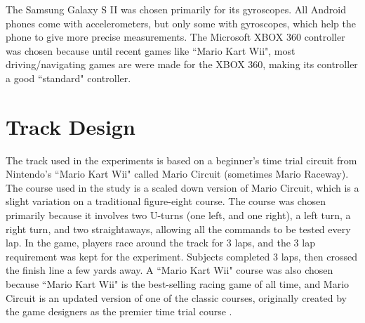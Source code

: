 \documentclass[12pt,a4paper]{report}
\begin{document}
The Samsung Galaxy S II was chosen primarily for its gyroscopes. All Android phones come with accelerometers, but only some with gyroscopes, which help the phone to give more precise measurements. The Microsoft XBOX 360 controller was chosen because until recent games like ``Mario Kart Wii", most driving/navigating games are were made for the XBOX 360, making its controller a good ``standard" controller.
\section{Track Design}
The track used in the experiments is based on a beginner's time trial circuit from Nintendo's ``Mario Kart Wii" called Mario Circuit (sometimes Mario Raceway). 
The course used in the study is a scaled down version of Mario Circuit, which is a slight variation on a traditional figure-eight course. The course was chosen primarily because it involves two U-turns (one left, and one right), a left turn, a right turn, and two straightaways, allowing all the commands to be tested every lap. In the game, players race around the track for 3 laps, and the 3 lap requirement was kept for the experiment. Subjects completed 3 laps, then crossed the finish line a few yards away. A ``Mario Kart Wii" course was also chosen because ``Mario Kart Wii" is the  best-selling racing game of all time, and Mario Circuit is an updated version of one of the classic courses, originally created by the game designers as the premier time trial course \cite{MarioCircuit}. 
\end{document}
